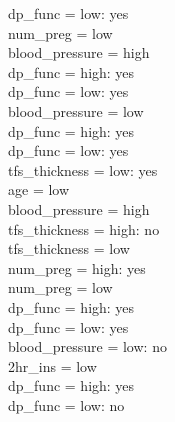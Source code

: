\documentclass[12pt]{article}
\begin{document}
\textbar\quad \textbar\quad \textbar\quad \textbar\quad \textbar\quad \textbar\quad dp\_func = low: yes\\
\textbar\quad \textbar\quad \textbar\quad \textbar\quad \textbar\quad num\_preg = low\\
\textbar\quad \textbar\quad \textbar\quad \textbar\quad \textbar\quad \textbar\quad blood\_pressure = high\\
\textbar\quad \textbar\quad \textbar\quad \textbar\quad \textbar\quad \textbar\quad \textbar\quad dp\_func = high: yes\\
\textbar\quad \textbar\quad \textbar\quad \textbar\quad \textbar\quad \textbar\quad \textbar\quad dp\_func = low: yes\\
\textbar\quad \textbar\quad \textbar\quad \textbar\quad \textbar\quad \textbar\quad blood\_pressure = low\\
\textbar\quad \textbar\quad \textbar\quad \textbar\quad \textbar\quad \textbar\quad \textbar\quad dp\_func = high: yes\\
\textbar\quad \textbar\quad \textbar\quad \textbar\quad \textbar\quad \textbar\quad \textbar\quad dp\_func = low: yes\\
\textbar\quad \textbar\quad \textbar\quad \textbar\quad tfs\_thickness = low: yes\\
\textbar\quad \textbar\quad \textbar\quad age = low\\
\textbar\quad \textbar\quad \textbar\quad \textbar\quad blood\_pressure = high\\
\textbar\quad \textbar\quad \textbar\quad \textbar\quad \textbar\quad tfs\_thickness = high: no\\
\textbar\quad \textbar\quad \textbar\quad \textbar\quad \textbar\quad tfs\_thickness = low\\
\textbar\quad \textbar\quad \textbar\quad \textbar\quad \textbar\quad \textbar\quad num\_preg = high: yes\\
\textbar\quad \textbar\quad \textbar\quad \textbar\quad \textbar\quad \textbar\quad num\_preg = low\\
\textbar\quad \textbar\quad \textbar\quad \textbar\quad \textbar\quad \textbar\quad \textbar\quad dp\_func = high: yes\\
\textbar\quad \textbar\quad \textbar\quad \textbar\quad \textbar\quad \textbar\quad \textbar\quad dp\_func = low: yes\\
\textbar\quad \textbar\quad \textbar\quad \textbar\quad blood\_pressure = low: no\\
\textbar\quad 2hr\_ins = low\\
\textbar\quad \textbar\quad dp\_func = high: yes\\
\textbar\quad \textbar\quad dp\_func = low: no\\
\end{document}
